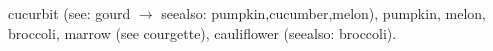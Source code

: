 \documentclass{article}
\begin{document}
\gls{cucurbit} (see: gourd $\to$ seealso: pumpkin,cucumber,melon), 
\gls{pumpkin}, \gls{melon}, \gls{broccoli},
\gls{marrow} (see courgette), \gls{cauliflower} (seealso: broccoli).

\printunsrtglossaries
\end{document}
